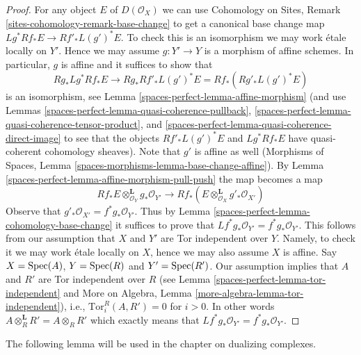 \begin{proof}
For any object $E$ of $D(\mathcal{O}_X)$ we can use
Cohomology on Sites, Remark \ref{sites-cohomology-remark-base-change}
to get a canonical base change map $Lg^*Rf_*E \to Rf'_*L(g')^*E$. To check this
is an isomorphism we may work \'etale locally on $Y'$. Hence we may assume
$g : Y' \to Y$ is a morphism of affine schemes. In particular, $g$
is affine and it suffices to show that
$$
Rg_*Lg^*Rf_*E \to Rg_*Rf'_*L(g')^*E = Rf_*(Rg'_* L(g')^* E)
$$
is an isomorphism, see Lemma \ref{spaces-perfect-lemma-affine-morphism}
(and use Lemmas \ref{spaces-perfect-lemma-quasi-coherence-pullback},
\ref{spaces-perfect-lemma-quasi-coherence-tensor-product}, and
\ref{spaces-perfect-lemma-quasi-coherence-direct-image}
to see that the objects $Rf'_*L(g')^*E$ and $Lg^*Rf_*E$
have quasi-coherent cohomology sheaves). Note that $g'$ is
affine as well (Morphisms of Spaces, Lemma
\ref{spaces-morphisms-lemma-base-change-affine}).
By Lemma \ref{spaces-perfect-lemma-affine-morphism-pull-push} the map becomes a map
$$
Rf_*E \otimes_{\mathcal{O}_Y}^\mathbf{L} g_*\mathcal{O}_{Y'}
\longrightarrow
Rf_*(E \otimes_{\mathcal{O}_X}^\mathbf{L} g'_*\mathcal{O}_{X'})
$$
Observe that $g'_*\mathcal{O}_{X'} = f^*g_*\mathcal{O}_{Y'}$. Thus by
Lemma \ref{spaces-perfect-lemma-cohomology-base-change} it suffices to prove that
$Lf^*g_*\mathcal{O}_{Y'} = f^*g_*\mathcal{O}_{Y'}$. This follows from our
assumption that $X$ and $Y'$ are Tor independent over $Y$. Namely, to
check it we may work \'etale locally on $X$, hence we may also assume $X$
is affine. Say $X = \operatorname{Spec}(A)$, $Y = \operatorname{Spec}(R)$ and $Y' = \operatorname{Spec}(R')$.
Our assumption implies that $A$ and $R'$ are Tor independent over $R$
(see
Lemma \ref{spaces-perfect-lemma-tor-independent}
and
More on Algebra, Lemma \ref{more-algebra-lemma-tor-independent}), i.e.,
$\text{Tor}_i^R(A, R') = 0$ for $i > 0$. In other words
$A \otimes_R^\mathbf{L} R' = A \otimes_R R'$ which exactly means
that $Lf^*g_*\mathcal{O}_{Y'} = f^*g_*\mathcal{O}_{Y'}$.
\end{proof}

The following lemma will be used in the chapter on dualizing complexes.

